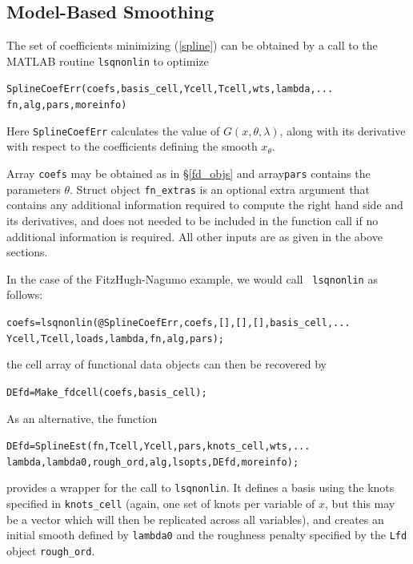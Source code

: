 \documentclass{article}
\newcommand{\nt}    {\noindent}
\begin{document}
\subsection{Model-Based Smoothing} \label{mod-smooth}

\nt The set of coefficients minimizing (\ref{spline}) can be obtained by a
call to the MATLAB routine {\tt lsqnonlin} to optimize

\begin{alltt}
  SplineCoefErr(coefs,basis_cell,Ycell,Tcell,wts,lambda,...
      fn,alg,pars,moreinfo)
\end{alltt}

\nt Here {\tt SplineCoefErr} calculates the value of
$G(x,\theta,\lambda)$, along with its derivative with
respect to the coefficients defining the smooth
$x_{\theta}$.

Array {\tt coefs} may be obtained as in \S\ref{fd_objs} and array{\tt pars} contains the parameters
$\theta$. Struct object {\tt fn\_extras} is an optional extra argument that contains any additional
information required to compute the right hand side and its derivatives, and does not needed to be
included in the function call if no additional information is required. All other inputs are as
given in the above sections.

In the case of the FitzHugh-Nagumo example, we would call {\tt
  lsqnonlin} as follows:

\begin{alltt}
   coefs = lsqnonlin(@SplineCoefErr,coefs,[],[],[],basis_cell,...
       Ycell,Tcell,loads,lambda,fn,alg,pars);
\end{alltt}

\nt the cell array of functional data objects can then be recovered by

\begin{alltt}
   DEfd = Make_fdcell(coefs,basis_cell);
\end{alltt}

\nt As an alternative, the function

\begin{alltt}
   DEfd = SplineEst(fn,Tcell,Ycell,pars,knots_cell,wts,...
        lambda,lambda0,rough_ord,alg,lsopts,DEfd,moreinfo);
\end{alltt}

\nt provides a wrapper for the call to {\tt lsqnonlin}. It defines a basis using the knots
specified in {\tt knots\_cell} (again, one set of knots per variable of $x$, but this may be a
vector which will then be replicated across all variables), and creates an initial smooth defined
by {\tt lambda0} and the roughness penalty specified by the {\tt Lfd} object {\tt rough\_ord}.
\end{document}
